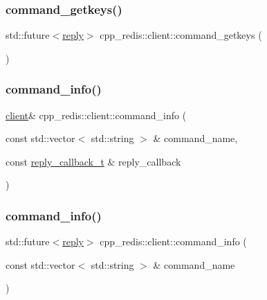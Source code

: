 \mbox{\label{classcpp__redis_1_1client_a18ab313316e99ab0a690540f40de80e3}} 
\subsubsection{\texorpdfstring{command\+\_\+getkeys()}{command\_getkeys()}\hspace{0.1cm}{\footnotesize\ttfamily [2/2]}}
{\footnotesize\ttfamily std\+::future$<$\hyperlink{classcpp__redis_1_1reply}{reply}$>$ cpp\+\_\+redis\+::client\+::command\+\_\+getkeys (\begin{DoxyParamCaption}{ }\end{DoxyParamCaption})}

\mbox{\label{classcpp__redis_1_1client_a95105c556aa5c070819bc82729d336c5}} 
\subsubsection{\texorpdfstring{command\+\_\+info()}{command\_info()}\hspace{0.1cm}{\footnotesize\ttfamily [1/2]}}
{\footnotesize\ttfamily \hyperlink{classcpp__redis_1_1client}{client}\& cpp\+\_\+redis\+::client\+::command\+\_\+info (\begin{DoxyParamCaption}\item[{const std\+::vector$<$ std\+::string $>$ \&}]{command\+\_\+name,  }\item[{const \hyperlink{classcpp__redis_1_1client_a061a1140d36d2eaeda82b09a0bb3f9f2}{reply\+\_\+callback\+\_\+t} \&}]{reply\+\_\+callback }\end{DoxyParamCaption})}

\mbox{\label{classcpp__redis_1_1client_abd02a4d296ed0c160e935cd176862334}} 
\subsubsection{\texorpdfstring{command\+\_\+info()}{command\_info()}\hspace{0.1cm}{\footnotesize\ttfamily [2/2]}}
{\footnotesize\ttfamily std\+::future$<$\hyperlink{classcpp__redis_1_1reply}{reply}$>$ cpp\+\_\+redis\+::client\+::command\+\_\+info (\begin{DoxyParamCaption}\item[{const std\+::vector$<$ std\+::string $>$ \&}]{command\+\_\+name }\end{DoxyParamCaption})}

